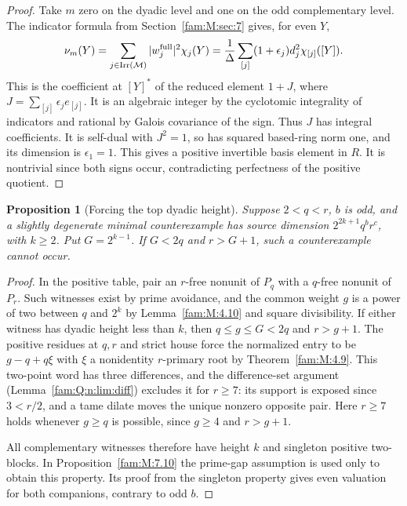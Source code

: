 \documentclass[11pt,a4paper]{article}
\numberwithin{equation}{section}
\newtheorem{proposition}[theorem]{Proposition}
\theoremstyle{remark}
\newcommand{\Irr}{\operatorname{Irr}}
\begin{document}
\begin{proof}
Take $m$ zero on the dyadic level and one on the odd complementary
level. The indicator formula from Section~\ref{fam:M:sec:7} gives, for even $Y$,
\[
 \nu_m(Y)=\sum_{j\in\Irr(\mathcal M)}
 |w^{\rm full}_j|^2\chi_j(Y)
 =\frac1\Delta\sum_{[j]}(1+\epsilon_j)d_j^2
 \chi_{[j]}([Y]).
\]
This is the coefficient at $[Y]^*$ of the reduced element $1+J$, where $J=\sum_{[j]}\epsilon_j e_{[j]}$.
It is an algebraic integer by the cyclotomic integrality of indicators \cite[Theorem~5.1]{NSpivot} and rational
by Galois covariance of the sign. Thus $J$ has integral coefficients.
It is self-dual with $J^2=1$, so has squared based-ring norm one,
and its dimension is $\epsilon_1=1$. This gives a positive invertible
basis element in $R$. It is nontrivial since both signs occur,
contradicting perfectness of the positive quotient.
\end{proof}

\begin{proposition}[Forcing the top dyadic height]\label{fam:Q:7.3}
\label{fam:Q:n:q12:septic}
Suppose $2<q<r$, $b$ is odd, and a slightly degenerate minimal
counterexample has source dimension $2^{2k+1}q^b r^c$, with $k\ge2$.
Put $G=2^{k-1}$. If $G<2q$ and $r>G+1$, such a counterexample
cannot occur.
\end{proposition}
\begin{proof}
In the positive table, pair an $r$-free nonunit of $P_q$ with
a $q$-free nonunit of $P_r$. Such witnesses exist by prime avoidance,
and the common weight $g$ is a power of two between $q$ and
$2^k$ by Lemma~\ref{fam:M:4.10} and square divisibility. If either
witness has dyadic height less than $k$, then $q\le g\le G<2q$
and $r>g+1$. The positive residues at $q,r$ and strict house force
the normalized entry to be $g-q+q\xi$ with $\xi$ a nonidentity
$r$-primary root by Theorem~\ref{fam:M:4.9}. This two-point word
has three differences, and the difference-set argument
(Lemma~\ref{fam:Q:n:lim:diff}) excludes it for $r\ge7$: its support is
exposed since $3<r/2$, and a tame dilate moves the unique nonzero
opposite pair. Here $r\ge7$ holds whenever $g\ge q$ is possible,
since $g\ge4$ and $r>g+1$.

All complementary witnesses therefore have height $k$ and singleton
positive two-blocks. In Proposition~\ref{fam:M:7.10} the prime-gap
assumption is used only to obtain this property. Its proof from
the singleton property gives even valuation for both companions,
contrary to odd $b$.
\end{proof}
\end{document}

